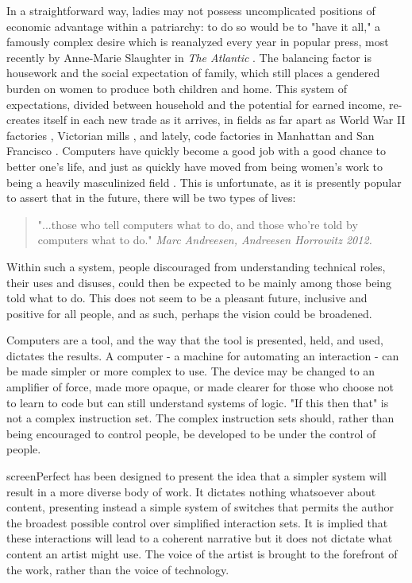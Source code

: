 In a straightforward way, ladies may not possess uncomplicated positions of economic advantage within a patriarchy: to do so would be to "have it all," a famously complex desire which is reanalyzed every year in popular press, most recently by Anne-Marie Slaughter in \textit{The Atlantic} \parencite{slaughter}. The balancing factor is housework and the social expectation of family, which still places a gendered burden on women to produce both children and home. This system of expectations, divided between household and the potential for earned income, re-creates itself in each new trade as it arrives, in fields as far apart as World War II factories \parencite{summerfield}, Victorian mills \parencite{baskerville}, and lately, code factories in Manhattan and San Francisco \parencite{newdomestic}. Computers have quickly become a good job with a good chance to better one's life, and just as quickly have moved from being women's work to being a heavily masculinized field \parencite{ensmenger}. This is unfortunate, as it is presently popular to assert that in the future, there will be two types of lives:

\begin{quote}
"...those who tell computers what to do, and those who're told by computers what to do."
\textit{Marc Andreesen, Andreesen Horrowitz 2012.}
\end{quote}

Within such a system, people discouraged from understanding technical roles, their uses and disuses, could then be expected to be mainly among those being told what to do. This does not seem to be a pleasant future, inclusive and positive for all people, and as such, perhaps the vision could be broadened.

Computers are a tool, and the way that the tool is presented, held, and used, dictates the results. A computer - a machine for automating an interaction - can be made simpler or more complex to use. The device may be changed to an amplifier of force, made more opaque, or made clearer for those who choose not to learn to code but can still understand systems of logic. "If this then that" is not a complex instruction set. The complex instruction sets should, rather than being encouraged to control people, be developed to be under the control of people.

screenPerfect has been designed to present the idea that a simpler system will result in a more diverse body of work. It dictates nothing whatsoever about content, presenting instead a simple system of switches that permits the author the broadest possible control over simplified interaction sets. It is implied that these interactions will lead to a coherent narrative but it does not dictate what content an artist might use. The voice of the artist is brought to the forefront of the work, rather than the voice of technology.

